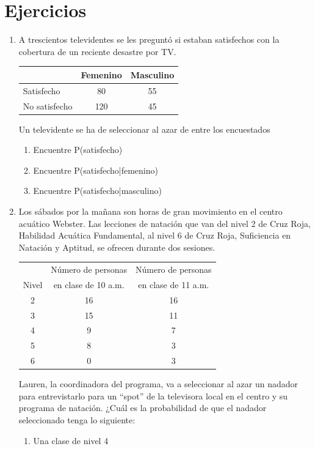 \documentclass[10pt,twoside]{article}
\begin{document}
\section*{Ejercicios}
\begin{enumerate}
\item A trescientos televidentes se les preguntó si estaban satisfechos con la cobertura de un reciente desastre por TV.
\begin{center}
\begin{tabular}{lcc}
 & Femenino & Masculino \\ 
\hline 
Satisfecho & 80 & 55 \\ 
\hline 
No satisfecho & 120 & 45 \\ 
\hline 
\end{tabular} 
\end{center}
Un televidente se ha de seleccionar al azar de entre los encuestados
\begin{enumerate}
\item Encuentre P(satisfecho)
\item Encuentre P(satisfecho|femenino)
\item Encuentre P(satisfecho|masculino)
\end{enumerate}
\item Los sábados por la mañana son horas de gran
movimiento en el centro acuático Webster. Las lecciones de natación que van del nivel 2 de Cruz Roja, Habilidad Acuática Fundamental, al nivel 6 de Cruz Roja, Suficiencia en Natación y Aptitud, se ofrecen durante dos sesiones.
\begin{center}
\begin{tabular}{ccc}
 & Número de personas & Número de personas \\
Nivel  & en clase de 10 a.m. & en clase de 11 a.m. \\  \hline
2 & 16 & 16 \\ 
3 & 15 & 11 \\ 
4 & 9 & 7 \\ 
5 & 8 & 3 \\ 
6 & 0 & 3 \\ 
\hline 
\end{tabular} 
\end{center}
Lauren, la coordinadora del programa, va a seleccionar al azar un nadador para entrevistarlo para un “spot” de la televisora local en el centro y su programa de natación. ¿Cuál es la probabilidad de que el nadador seleccionado tenga lo siguiente:
\begin{enumerate}
\item Una clase de nivel 4

\end{enumerate}
\end{enumerate}
\end{document}
